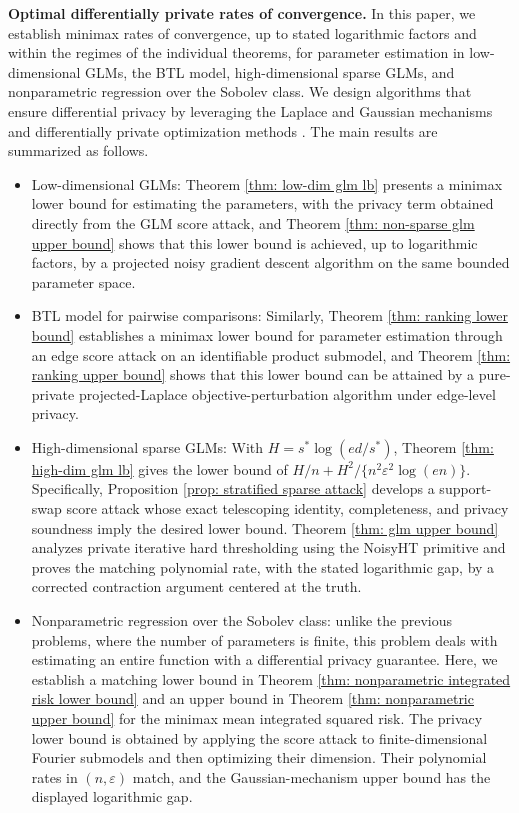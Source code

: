 \documentclass[letterpaper,12pt]{article}
\numberwithin{equation}{section}
\theoremstyle{plain}
\numberwithin{Theorem}{section}
\numberwithin{proposition}{section}
\numberwithin{Lemma}{section}
{
	\theoremstyle{definition}
	\newtheorem{Definition}{Definition}
	\newtheorem{example}{Example}
	\numberwithin{example}{section}
	\newtheorem{fact}{Fact}
	\numberwithin{fact}{section}
	\newtheorem{remark}{Remark}
}
\newcommand{\rev}[1]{#1}
\newcommand{\furtherrev}[1]{#1}
\newcommand{\1}{\mathbbm{1}}
\begin{document}
 \textbf{Optimal differentially private rates of convergence.} In this paper, we establish minimax rates of convergence, up to stated logarithmic factors and within the regimes of the individual theorems, for parameter estimation in low-dimensional GLMs, the BTL model, high-dimensional sparse GLMs, and \furtherrev{nonparametric} regression over the Sobolev class. \rev{We design algorithms that ensure differential privacy by leveraging the Laplace and Gaussian mechanisms \cite{dwork2006calibrating} and differentially private optimization methods \cite{bassily2014private,bassily2019private,chaudhuri2011differentially,kifer2012private}.} 
The main results are summarized as follows.
\begin{itemize}
	\item Low-dimensional GLMs: Theorem \ref{thm: low-dim glm lb} presents a minimax lower bound for estimating the parameters, \rev{with the privacy term obtained directly from the GLM score attack,} and Theorem \ref{thm: non-sparse glm upper bound} shows that this lower bound is achieved, up to logarithmic factors, by a \rev{projected noisy gradient descent algorithm on the same bounded parameter space}.
		\item BTL model for pairwise comparisons: Similarly, Theorem \ref{thm: ranking lower bound} establishes a minimax lower bound for parameter estimation \rev{through an edge score attack on an identifiable product submodel,} and Theorem \ref{thm: ranking upper bound} shows that this lower bound can be attained by a \rev{pure-private projected-Laplace objective-perturbation algorithm under edge-level privacy}.
	\item \rev{High-dimensional sparse GLMs: With $H=s^*\log(ed/s^*)$, Theorem \ref{thm: high-dim glm lb} gives the lower bound of $H/n+H^2/\{n^2\varepsilon^2\log(en)\}$. Specifically, Proposition \ref{prop: stratified sparse attack} develops a support-swap score attack whose exact telescoping identity, completeness, and privacy soundness imply the desired lower bound. Theorem \ref{thm: glm upper bound} analyzes \furtherrev{private iterative hard thresholding using the NoisyHT primitive} and proves the matching polynomial rate, with the stated logarithmic gap, by a corrected contraction argument centered at the truth.}
	\item \furtherrev{Nonparametric} regression over the Sobolev class: unlike the previous problems, where the number of parameters is finite, this problem deals with estimating an entire function with a differential privacy guarantee. Here, we establish a matching lower bound in Theorem \ref{thm: nonparametric integrated risk lower bound} and an upper bound in Theorem \ref{thm: nonparametric upper bound} for the minimax mean integrated squared risk. \rev{The privacy lower bound is obtained by applying the score attack to finite-dimensional Fourier submodels and then optimizing their dimension. Their polynomial rates in $(n,\varepsilon)$ match, and the Gaussian-mechanism upper bound has the displayed logarithmic gap.}
\end{itemize}
\end{document}
